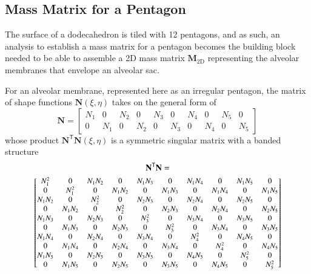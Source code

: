 \subsection{Mass Matrix for a Pentagon}

The surface of a dodecahedron is tiled with 12 pentagons, and as such, an analysis to establish a mass matrix for a pentagon becomes the building block needed to be able to assemble a 2D mass matrix $\mathbf{M}_{\mathrm{2D}}$ representing the alveolar membranes that envelope an alveolar sac.

For an alveolar membrane, represented here as an irregular pentagon, the matrix of shape functions $\mathbf{N}(\xi,\eta)$ takes on the general form of
\begin{equation}
\mathbf{N} = 
\begin{bmatrix}
N_1 & 0 & N_2 & 0 & N_3 & 0 & N_4 & 0 & N_5 & 0 \\ 
0 & N_1 & 0 & N_2 & 0 & N_3 & 0 & N_4 & 0 & N_5 
\end{bmatrix} 
\label{shape2D}
\end{equation}
whose product $\mathbf{N}^{\mathsf{T}}\mathbf{N}(\xi,\eta)$ is a symmetric singular matrix with a banded structure
\begin{multline}
     \mathbf{N}^{\mathsf{T}} \mathbf{N} = \\ \footnotesize \begin{bmatrix}
     N_1^2 & 0 & N_1 N_2 & 0 & N_1 N_3 & 0 & N_1 N_4 & 0 & N_1 N_5 & 0 \\
     0 & N_1^2 & 0 & N_1 N_2 & 0 & N_1 N_3 & 0 & N_1 N_4 & 0 & N_1 N_5 \\
     N_1 N_2 & 0 & N_2^2 & 0 & N_2 N_3 & 0 & N_2 N_4 & 0 & N_2 N_5 & 0 \\
     0 & N_1 N_2 & 0 & N_2^2 & 0 & N_2 N_3 & 0 & N_2 N_4 & 0 & N_2 N_5 \\
     N_1 N_3 & 0 & N_2 N_3 & 0 & N_3^2 & 0 & N_3 N_4 & 0 & N_3 N_5 & 0 \\
     0 & N_1 N_3 & 0 & N_2 N_3 & 0 & N_3^2 & 0 & N_3 N_4 & 0 & N_3 N_5 \\
     N_1 N_4 & 0 & N_2 N_4 & 0 & N_3 N_4 & 0 & N_4^2 & 0 & N_4 N_5 & 0 \\
     0 & N_1 N_4 & 0 & N_2 N_4 & 0 & N_3 N_4 & 0 & N_4^2 & 0 & N_4 N_5 \\
     N_1 N_5 & 0 & N_2 N_5 & 0 & N_3 N_5 & 0 & N_4 N_5 & 0 & N_5^2 & 0 \\
     0 & N_1 N_5 & 0 & N_2 N_5 & 0 & N_3 N_5 & 0 & N_4 N_5 & 0 & N_5^2
     \end{bmatrix}
\end{multline}
